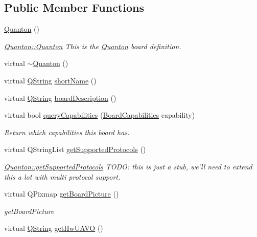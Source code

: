 \subsection*{Public Member Functions}
\begin{DoxyCompactItemize}
\item 
\hyperlink{group___boards___quantec_ga39ce601b1744d463fc4a56681c46135f}{Quanton} ()
\begin{DoxyCompactList}\small\item\em \hyperlink{group___boards___quantec_ga39ce601b1744d463fc4a56681c46135f}{Quanton\-::\-Quanton} This is the \hyperlink{class_quanton}{Quanton} board definition. \end{DoxyCompactList}\item 
virtual \hyperlink{group___boards___quantec_ga8fdeca3eefac72603d963569a4ef7a5d}{$\sim$\-Quanton} ()
\item 
virtual \hyperlink{group___u_a_v_objects_plugin_gab9d252f49c333c94a72f97ce3105a32d}{Q\-String} \hyperlink{group___boards___quantec_gab687582af9051f5955c3c797244dcb64}{short\-Name} ()
\item 
virtual \hyperlink{group___u_a_v_objects_plugin_gab9d252f49c333c94a72f97ce3105a32d}{Q\-String} \hyperlink{group___boards___quantec_gae3241fa8f27da1d6e9e01e92be744d71}{board\-Description} ()
\item 
virtual bool \hyperlink{group___boards___quantec_gafceea1eeec5e241c7526b8217b6d9ff9}{query\-Capabilities} (\hyperlink{group___core_plugin_ga01b09218f2a13aaeee6db007ac6bd967}{Board\-Capabilities} capability)
\begin{DoxyCompactList}\small\item\em Return which capabilities this board has. \end{DoxyCompactList}\item 
virtual Q\-String\-List \hyperlink{group___boards___quantec_ga8e7000bd17a41b004dbb8e9639387eb1}{get\-Supported\-Protocols} ()
\begin{DoxyCompactList}\small\item\em \hyperlink{group___boards___quantec_ga8e7000bd17a41b004dbb8e9639387eb1}{Quanton\-::get\-Supported\-Protocols} T\-O\-D\-O\-: this is just a stub, we'll need to extend this a lot with multi protocol support. \end{DoxyCompactList}\item 
virtual Q\-Pixmap \hyperlink{group___boards___quantec_gabf4519ffd0e2aaa2c692d9ec58b3bfd1}{get\-Board\-Picture} ()
\begin{DoxyCompactList}\small\item\em get\-Board\-Picture \end{DoxyCompactList}\item 
virtual \hyperlink{group___u_a_v_objects_plugin_gab9d252f49c333c94a72f97ce3105a32d}{Q\-String} \hyperlink{group___boards___quantec_gaf97ebd024db824870ba29203fd6d0bb6}{get\-Hw\-U\-A\-V\-O} ()
\end{DoxyCompactItemize}
